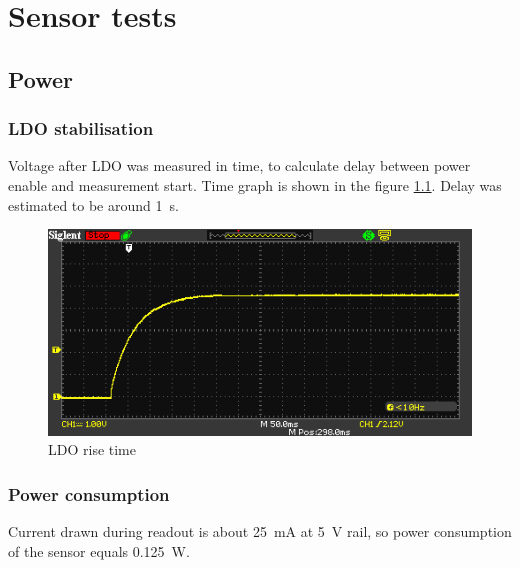 \chapter{Sensor tests}


\section{Power}
    \subsection{LDO stabilisation}
        Voltage after LDO was measured in time, to calculate delay between power enable and measurement start. Time graph is shown in the figure \ref{LDO_rise_time}. Delay was estimated to be around \SI{1}{\second}.

        \begin{figure}[H]
            \centering
            \includegraphics[width=0.8\paperwidth]{img/07/rise_time.png}
            \caption{LDO rise time}
            \label{LDO_rise_time}
        \end{figure}

    \subsection{Power consumption}
        Current drawn during readout is about \SI{25}{\milli\ampere} at \SI{5}{\volt} rail, so power consumption of the sensor equals \SI{0.125}{\watt}.

